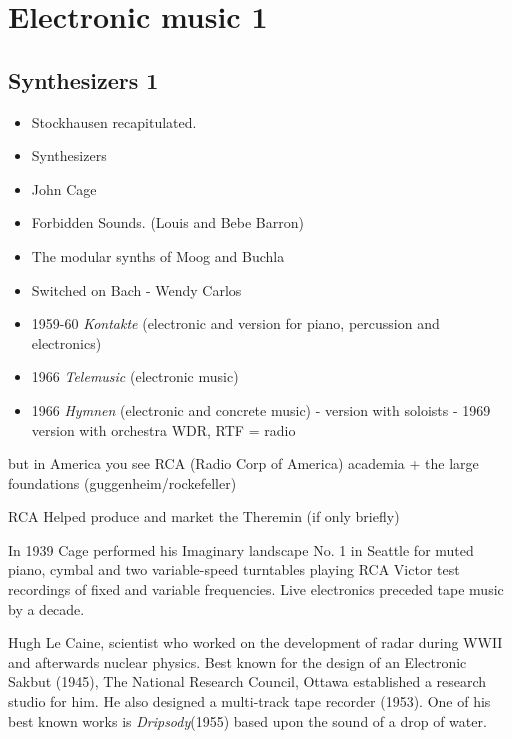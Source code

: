 
\chapter{Electronic music 1}
\label{history2}

\section{Synthesizers 1}
\begin{itemize}
\item Stockhausen recapitulated.
\item Synthesizers
\item John Cage
\item Forbidden Sounds. (Louis and Bebe Barron)
\item The modular synths of Moog and Buchla
\item Switched on Bach - Wendy Carlos
\end{itemize}

\begin{itemize}
\item 1959-60 \textit{Kontakte} (electronic and version for piano, percussion and electronics)
\item 1966 \textit{Telemusic} (electronic music)
\item 1966 \textit{Hymnen} (electronic and concrete music) - version with soloists - 1969 version with orchestra
WDR, RTF = radio
\end{itemize}

but in America you see RCA (Radio Corp of America) academia + the large foundations (guggenheim/rockefeller)

RCA Helped produce and market the Theremin (if only briefly)

In 1939 Cage performed his Imaginary landscape No. 1 in Seattle for muted piano, cymbal and two variable-speed turntables playing RCA Victor test recordings of fixed and variable frequencies. Live electronics preceded tape music by a decade.

Hugh Le Caine, scientist who worked on the development of radar during WWII and afterwards nuclear physics. Best known for the design of an Electronic Sakbut (1945), The National Research Council, Ottawa established a research studio for him. He also designed a multi-track tape recorder (1953). One of his best known works is \textit{Dripsody}(1955) based upon the sound of a drop of water.

